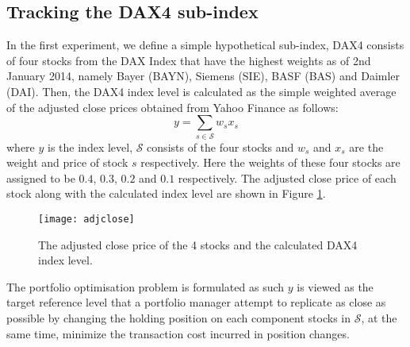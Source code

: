 \subsection{Tracking the DAX4 sub-index}
In the first experiment, we define a simple hypothetical sub-index, DAX4 consists of four stocks from the DAX Index that have the highest weights as of 2nd January 2014, namely Bayer (BAYN), Siemens (SIE), BASF (BAS) and Daimler (DAI). Then, the DAX4 index level is calculated as the simple weighted average of the adjusted close prices obtained from Yahoo Finance as follows:
\begin{equation}
  y = \sum_{s \in \mathcal{S}} w_s x_s
\end{equation}
where $y$ is the index level, $\mathcal{S}$ consists of the four stocks and  $w_s$ and $x_s$ are the weight and price of stock $s$ respectively. Here the weights of these four stocks are assigned to be $0.4$, $0.3$, $0.2$ and $0.1$ respectively. The adjusted close price of each stock along with the calculated index level are shown in Figure \ref{fig:adjclose}.
 
\begin{figure}[htbp]
\centering
\texttt{[image: adjclose]}
\caption{The adjusted close price of the 4 stocks and the calculated DAX4 index level.}
\label{fig:adjclose}
\end{figure}
 
The portfolio optimisation problem is formulated as such $y$ is viewed as the target reference level that a portfolio manager attempt to replicate as close as possible by changing the holding position on each component stocks in $\mathcal{S}$, at the same time, minimize the transaction cost incurred in position changes.
 
